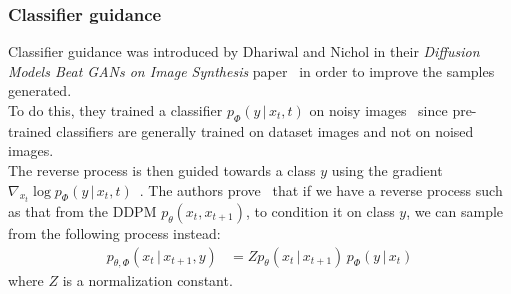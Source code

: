 \documentclass{article}
\numberwithin{equation}{section}
\numberwithin{figure}{section}
\begin{document}
\subsubsection{Classifier guidance}
Classifier guidance was introduced by Dhariwal and Nichol in their \textit{Diffusion Models Beat GANs on Image Synthesis} paper~\cite{dhariwal2021diffusion} in order to improve the samples generated. \\
To do this, they trained a classifier $p_\Phi (y \, | \, x_t, t)$ on noisy images~\cite{dhariwal2021diffusion} since pre-trained classifiers are generally trained on dataset images and not on noised images. \\
The reverse process is then guided towards a class $y$ using the gradient $\nabla_{x_t} \log p_\Phi (y \, | \, x_t, t)$~\cite{dhariwal2021diffusion}.
The authors prove~\cite{dhariwal2021diffusion} that if we have a reverse process such as that from the DDPM $p_\theta (x_t, x_{t+1})$, to condition it on class $y$, we can sample from the following process instead:
\begin{align}
  p_{\theta, \Phi} (x_t \, | \, x_{t+1}, y) &= Z p_\theta (x_t \, | \, x_{t+1}) \, p_\Phi(y \, | \, x_t)
\end{align}
where $Z$ is a normalization constant.
\end{document}
